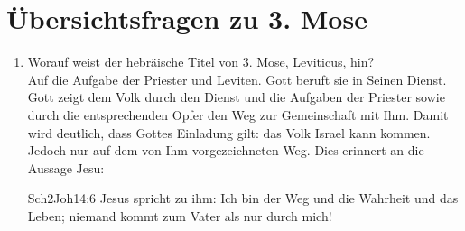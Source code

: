 \section{Übersichtsfragen zu 3. Mose}
\begin{enumerate}
    \item Worauf weist der hebräische Titel von 3. Mose, Leviticus, hin?\\
    Auf die Aufgabe der Priester und Leviten. Gott beruft sie in Seinen Dienst. Gott zeigt dem Volk durch den Dienst und die Aufgaben der Priester sowie durch die entsprechenden Opfer den Weg zur Gemeinschaft mit Ihm. Damit wird deutlich, dass Gottes Einladung gilt: das Volk Israel kann kommen. Jedoch nur auf dem von Ihm vorgezeichneten Weg. Dies erinnert an die Aussage Jesu:
\begin{bibeltext}{Sch2}{Joh}{14:6}
    Jesus spricht zu ihm: Ich bin der Weg und die Wahrheit und das Leben; niemand kommt zum Vater als nur durch mich!
\end{bibeltext}
\end{enumerate}